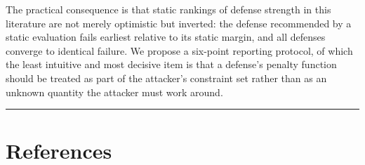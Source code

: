 \documentclass[review,3p,times]{elsarticle}
\begin{document}
The practical consequence is that static rankings of defense strength in this literature are not merely optimistic but inverted: the defense recommended by a static evaluation fails earliest relative to its static margin, and all defenses converge to identical failure. We propose a six-point reporting protocol, of which the least intuitive and most decisive item is that a defense's penalty function should be treated as part of the attacker's constraint set rather than as an unknown quantity the attacker must work around.

\begin{center}\rule{0.5\linewidth}{0.5pt}\end{center}

\section{References}\label{references}
\end{document}

